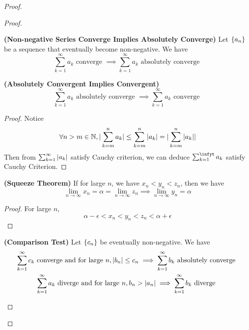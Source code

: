 \documentclass{report}
\begin{document}
\begin{proof}
\begin{proof}
\begin{theorem}
\label{4.3.4}
\textbf{(Non-negative Series Converge Implies Absolutely Converge)} Let $\{ a_n \}$ be a sequence that eventually become non-negative. We have
\begin{equation}
\sum_{k=1}^\infty a_k\text{ converge }\implies \sum_{k=1}^\infty a_k\text{ absolutely converge }
\end{equation}
\end{theorem}
\begin{theorem}
\label{4.3.5}
\textbf{(Absolutely Convergent Implies Convergent)} 
\begin{equation}
\sum_{k=1}^\infty a_k\text{ absolutely converge }\implies \sum_{k=1}^\infty a_k\text{ converge }
\end{equation}
\end{theorem}
\begin{proof}
Notice 
\begin{equation}
\forall n>m \in\mathbb{N}, |\sum_{k=m}^n a_k|\leq \sum_{k=m}^n |a_k|=|\sum_{k=m}^n |a_k||
\end{equation}
Then from $\sum_{k=1}^\infty |a_k|$ satisfy Cauchy criterion, we can deduce $\sum_{k=1}^\infyt a_k$ satisfy Cauchy Criterion. 
\end{proof}
\begin{theorem}
\label{4.3.6}
\textbf{(Squeeze Theorem)} If for large $n$, we have  $x_n<y_n<z_n$, then we have
 \begin{equation}
\lim_{n\to\infty}x_n=\alpha =\lim_{n\to\infty}z_n\implies \lim_{n\to\infty}y_n=\alpha 
\end{equation}
\end{theorem}
\begin{proof}
For large $n$, 
 \begin{equation}
\alpha -\epsilon <x_n<y_n<z_n<\alpha +\epsilon 
\end{equation}
\end{proof}
\begin{theorem}
\label{4.3.7}
\textbf{(Comparison Test)} Let $\{ c_n \}$ be eventually non-negative. We have
\begin{gather}
  \sum_{k=1}^\infty c_k\text{ converge and for large }n, \abso{b_n}\leq c_n\implies \sum_{k=1}^\infty b_k\text{ absolutely converge }\\
  \sum_{k=1}^\infty a_k\text{ diverge and for large $n$}, b_n>\abso{a_n}\implies \sum_{k=1}^\infty b_k\text{ diverge }

\end{gather}
\end{theorem}
\end{proof}
\end{proof}
\end{document}
